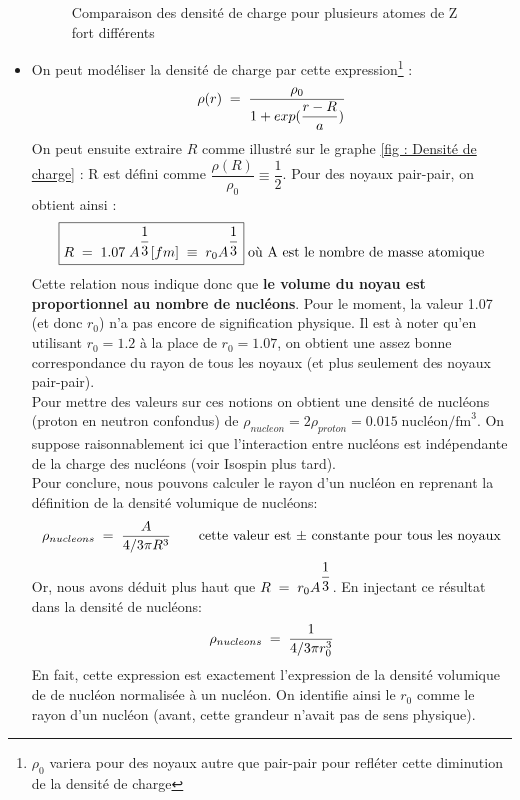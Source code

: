 \begin{itemize}[label=$\bullet$]
\begin{figure}[H]
        \caption{Comparaison des densité de charge pour plusieurs atomes de Z fort différents}
        \label{fig : Comparaison des densités de charge noyaux lourds}
    \end{figure}
    \item On peut modéliser la densité de charge par cette expression\footnote{$\rho_0$ variera pour des noyaux autre que pair-pair pour refléter cette diminution de la densité de charge} :
    \begin{equation*}
        \rho(r) \; = \; \dfrac{\rho_0}{1 + exp (\dfrac{r - R}{a})}
    \end{equation*}
    On peut ensuite extraire $R$ comme illustré sur le graphe \ref{fig : Densité de charge} : R est défini comme $\dfrac{\rho(R)}{\rho_0} \equiv \dfrac{1}{2}$. Pour des noyaux pair-pair, on obtient ainsi :
    \begin{equation*}
        \boxed{
            R \; = \; 1.07\; A^{\dfrac{1}{3}} [fm] \;\equiv\; r_0A^{\dfrac{1}{3}}
        } \; \text{où A est le nombre de masse atomique}
    \end{equation*}
    Cette relation nous indique donc que \textbf{le volume du noyau est proportionnel au nombre de nucléons}. Pour le moment, la valeur 1.07 (et donc $r_0$) n'a pas encore de signification physique. Il est à noter qu'en utilisant $r_0=1.2$ à la place de $r_0=1.07$, on obtient une assez bonne correspondance du rayon de tous les noyaux (et plus seulement des noyaux pair-pair).
    \smallskip\\
    Pour mettre des valeurs sur ces notions on obtient une densité de nucléons (proton en neutron confondus) de $\rho_{nucleon} = 2\rho_{proton} = 0.015 \;\text{nucléon/fm}^3$. On suppose raisonnablement ici que l'interaction entre nucléons est indépendante de la charge des nucléons (voir Isospin plus tard).\\
    Pour conclure, nous pouvons calculer le rayon d'un nucléon
    en reprenant la définition de la densité volumique de nucléons:
    \begin{equation*}
        \rho_{nucleons} \; = \; \dfrac{A}{4/3 \pi R^3 } \qquad \text{cette valeur est $\pm$ constante pour tous les noyaux}
    \end{equation*}
    Or, nous avons déduit plus haut que $R \; = \; r_0A^{\dfrac{1}{3}}$. En injectant ce résultat dans la densité de nucléons:
    \begin{equation*}
        \rho_{nucleons} \; = \; \dfrac{1}{4/3 \pi r_0^3}
    \end{equation*}
    En fait, cette expression est exactement l'expression de la densité volumique de de nucléon normalisée à un nucléon. On identifie ainsi le $r_0$ comme le rayon d'un nucléon (avant, cette grandeur n'avait pas de sens physique).\\


\end{itemize}
